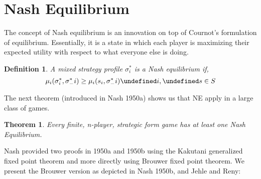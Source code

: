 \documentclass[dvips,11pt]{article}
\let\oldforall\forall
\let\forall\undefined
\DeclareMathOperator{\forall}{\,\oldforall\,}
\DeclareMathOperator{\?}{\,?\,}
\newtheorem{theorem}{Theorem}[section]
\newtheorem{definition}{Definition}[section]
\begin{document}
\section{Nash Equilibrium}
The concept of Nash equilibrium is an innovation on top of Cournot's formulation of equilibrium. Essentially, it is a state in which each player is maximizing their expected utility with respect to what everyone else is doing.
\begin{definition} A mixed strategy profile $\sigma^*_i$ is a Nash equilibrium if,
$$\mu_i(\sigma^*_i, \sigma^*_-i) \geq \mu_i(s_i, \sigma^*_-i) \forall i, \forall s \in S$$
\end{definition}
The next theorem (introduced in Nash 1950a) shows us that NE apply in a large class of games. 
\begin{theorem}
Every finite, n-player, strategic form game has at least one Nash Equilibrium.
\end{theorem}
Nash provided two proofs in 1950a and 1950b using the Kakutani generalized fixed point theorem and  more directly using Brouwer fixed point theorem. We present the Brouwer version as depicted in Nash 1950b, and Jehle and Reny:
\end{document}
